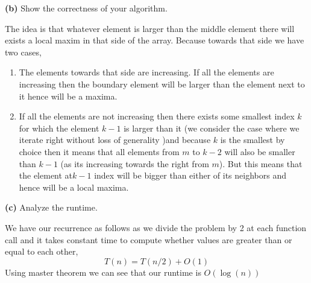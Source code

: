 \documentclass[12pt]{article}
\newcommand{\question}[3][Q]{
\begin{description}
\item \textbf{#1{#2}} #3
\end{description}
}
\begin{document}
\question[]{(b)}{
    Show the correctness of your algorithm.
}
\begin{answer}
    The idea is that whatever element is larger than the middle element there will exists a local maxim in that side of the array. Because towards that side we have two cases, 
    \begin{enumerate}
        \item The elements towards that side are increasing. If all the elements are increasing then the boundary element will be larger than the element next to it hence will be a maxima.
        \item If all the elements are not increasing then there exists some smallest index $k$ for which the element $k - 1$ is larger than it (we consider the case where we iterate right without loss of generality )and because $k$ is the smallest by choice then it means that all elements from $m$ to  $k - 2$ will also be smaller than $k - 1$ (as its increasing towards the right from $m$). But this means that the element at$k - 1$ index will be bigger than either of its neighbors and hence will be a local maxima.
    \end{enumerate}
\end{answer}

\question[]{(c)}{
    Analyze the runtime.
}
\begin{answer}
    We have our recurrence as follows as we divide the problem by 2 at each function call and it takes constant time to compute whether values are greater than or equal to each other,
    $$ T(n) = T(n /2) + O(1) $$ 
    Using master theorem we can see that our runtime is $O(\log(n))$

\end{answer}
\end{document}
